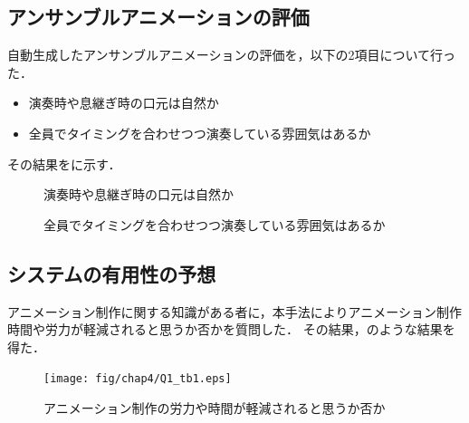 \subsection{アンサンブルアニメーションの評価}
自動生成したアンサンブルアニメーションの評価を，以下の2項目について行った．
\begin{itemize}
	\item 演奏時や息継ぎ時の口元は自然か
	\item 全員でタイミングを合わせつつ演奏している雰囲気はあるか
\end{itemize}
その結果をに示す．
\begin{figure}[!h]
	\centering
	\hspace{2mm}
	\caption{演奏時や息継ぎ時の口元は自然か}
	\label{fig:Q3-1}
\end{figure}
\begin{figure}[!h]
	\centering
	\caption{全員でタイミングを合わせつつ演奏している雰囲気はあるか}
	\label{fig:Q3-2}
\end{figure}
\newpage
\subsection{システムの有用性の予想}
アニメーション制作に関する知識がある者に，本手法によりアニメーション制作時間や労力が軽減されると思うか否かを質問した．
その結果，のような結果を得た．
\begin{figure}[!h]
	\centering
	\texttt{[image: fig/chap4/Q1\_tb1.eps]}
	\caption{アニメーション制作の労力や時間が軽減されると思うか否か}
	\label{fig:ans2}
\end{figure}